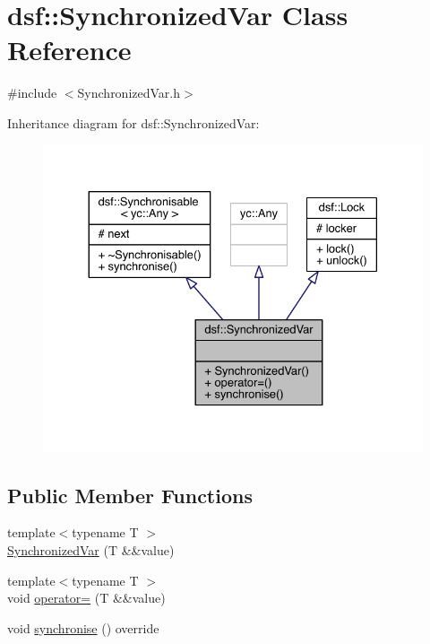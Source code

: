 \hypertarget{classdsf_1_1_synchronized_var}{}\section{dsf\+:\+:Synchronized\+Var Class Reference}
\label{classdsf_1_1_synchronized_var}


{\ttfamily \#include $<$Synchronized\+Var.\+h$>$}



Inheritance diagram for dsf\+:\+:Synchronized\+Var\+:\nopagebreak
\begin{figure}[H]
\begin{center}
\leavevmode
\includegraphics[width=330pt]{classdsf_1_1_synchronized_var__inherit__graph}
\end{center}
\end{figure}
\subsection*{Public Member Functions}
\begin{DoxyCompactItemize}
\item 
{\footnotesize template$<$typename T $>$ }\\\hyperlink{classdsf_1_1_synchronized_var_aada6540bf8bbbf1451834f31aad0962f}{Synchronized\+Var} (T \&\&value)
\item 
{\footnotesize template$<$typename T $>$ }\\void \hyperlink{classdsf_1_1_synchronized_var_a8b72cc04251d677755090bd9b834291c}{operator=} (T \&\&value)
\item 
void \hyperlink{classdsf_1_1_synchronized_var_ac8465a885c4dbb5bc5ca9ad25f42c3ec}{synchronise} () override
\end{DoxyCompactItemize}
